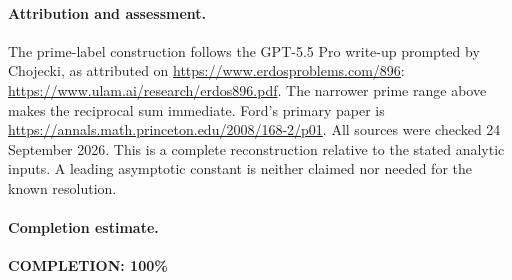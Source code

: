 \paragraph{Attribution and assessment.}
The prime-label construction follows the GPT-5.5 Pro
write-up prompted by Chojecki, as attributed on
\url{https://www.erdosproblems.com/896}:
\url{https://www.ulam.ai/research/erdos896.pdf}.
The narrower prime range above makes the reciprocal
sum immediate. Ford's primary paper is
\url{https://annals.math.princeton.edu/2008/168-2/p01}.
All sources were checked 24 September 2026.
This is a complete reconstruction relative to the stated
analytic inputs. A leading asymptotic constant is neither
claimed nor needed for the known resolution.

\paragraph{Completion estimate.}
\textbf{COMPLETION: 100\%}
